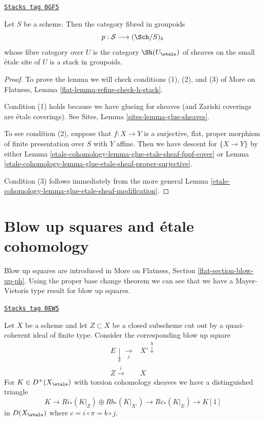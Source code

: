 \begin{lemma}
\label{etale-cohomology-lemma-h-descent-etale-sheaves}
\href{https://stacks.math.columbia.edu/tag/0GF5}{\texttt{Stacks tag 0GF5}}

Let $S$ be a scheme. Then the category fibred in groupoids
$$
p : \mathcal{S} \longrightarrow (\Sch/S)_h
$$
whose fibre category over $U$ is the category $\Sh(U_\etale)$
of sheaves on the small \'etale site of $U$ is a stack in groupoids.
\end{lemma}

\begin{proof}
To prove the lemma we will check conditions (1), (2), and (3) of
More on Flatness, Lemma \ref{flat-lemma-refine-check-h-stack}.

\medskip\noindent
Condition (1) holds because we have glueing for sheaves (and
Zariski coverings are \'etale coverings). See
Sites, Lemma \ref{sites-lemma-glue-sheaves}.

\medskip\noindent
To see condition (2), suppose that $f : X \to Y$ is a surjective,
flat, proper morphism of finite presentation over $S$ with $Y$ affine.
Then we have descent for $\{X \to Y\}$ by either
Lemma \ref{etale-cohomology-lemma-glue-etale-sheaf-fppf-cover} or
Lemma \ref{etale-cohomology-lemma-glue-etale-sheaf-proper-surjective}.

\medskip\noindent
Condition (3) follows immediately from the more general
Lemma \ref{etale-cohomology-lemma-glue-etale-sheaf-modification}.
\end{proof}

\section{Blow up squares and \'etale cohomology}
\label{etale-cohomology-section-blow-up-square}
Blow up squares are introduced in
More on Flatness, Section \ref{flat-section-blow-up-ph}.
Using the proper base change theorem we can see that
we have a Mayer-Vietoris type result for blow up squares.

\begin{lemma}
\label{etale-cohomology-lemma-blow-up-square-cohomological-descent}
\href{https://stacks.math.columbia.edu/tag/0EW5}{\texttt{Stacks tag 0EW5}}

Let $X$ be a scheme and let $Z \subset X$ be a closed subscheme
cut out by a quasi-coherent ideal of finite type. Consider the
corresponding blow up square
$$
\begin{array}{cc}E \underset{\pi}{\downarrow}\underset{j}{\longrightarrow} & X' \overset{b}{\downarrow} \\ Z \overset{i}{\longrightarrow} & X\end{array}
$$
For $K \in D^+(X_\etale)$ with torsion cohomology sheaves
we have a distinguished triangle
$$
K \to Ri_*(K|_Z) \oplus Rb_*(K|_{X'}) \to Rc_*(K|_E) \to K[1]
$$
in $D(X_\etale)$ where $c = i \circ \pi = b \circ j$.
\end{lemma}

